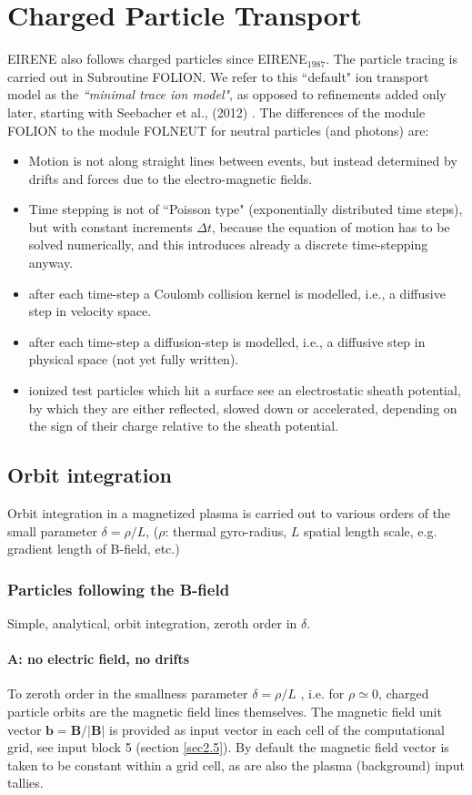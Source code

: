 \section{Charged Particle Transport}
EIRENE also follows charged particles since EIRENE$_{1987}$. The particle tracing is
carried out in Subroutine FOLION.
We refer to this ``default" ion transport model as the \emph{``minimal trace ion model"}, as opposed to
refinements added only later, starting with Seebacher et al., (2012) \cite{kn:Seebacher}.
The differences of the module FOLION to
the module FOLNEUT for neutral particles (and photons) are:
\begin{itemize}
\item Motion is not along straight lines between events, but instead
determined by drifts and forces due to the electro-magnetic fields.
\item Time stepping is not of ``Poisson type" (exponentially distributed time steps), but with constant increments $\Delta t$,
because the equation of motion has to be solved numerically, and this introduces already a discrete time-stepping anyway.
\item after each time-step a Coulomb collision kernel is modelled,
i.e., a diffusive step in velocity space.
\item after each time-step a diffusion-step is modelled,
i.e., a diffusive step in physical space (not yet fully written).
\item ionized test particles which hit a surface see an electrostatic sheath potential,
by which they are either reflected, slowed down or accelerated,
depending on the sign of their charge relative to the sheath
potential.
\end{itemize}
\subsection{Orbit integration}
Orbit integration in a magnetized plasma is carried out to various orders
of the small parameter $\delta = \rho/L$, ($\rho$:
thermal gyro-radius, $L$ spatial length scale, e.g. gradient length of B-field, etc.)
\subsubsection{Particles following the B-field}
Simple, analytical, orbit integration, zeroth order in $\delta$.
\paragraph{A: no electric field, no drifts\\}
To zeroth order in the smallness parameter $\delta=\rho/L$ , i.e. for $\rho \simeq 0$,
charged particle orbits are the magnetic field lines themselves.
The magnetic field unit vector $\textbf{b}=\textbf{B}/|\textbf{B}|$ is provided as input
vector in each cell of the computational
grid, see input block 5 (section  \ref{sec2.5}). By default the magnetic field vector
is taken to be constant within a grid cell, as are also the plasma (background) input tallies.

